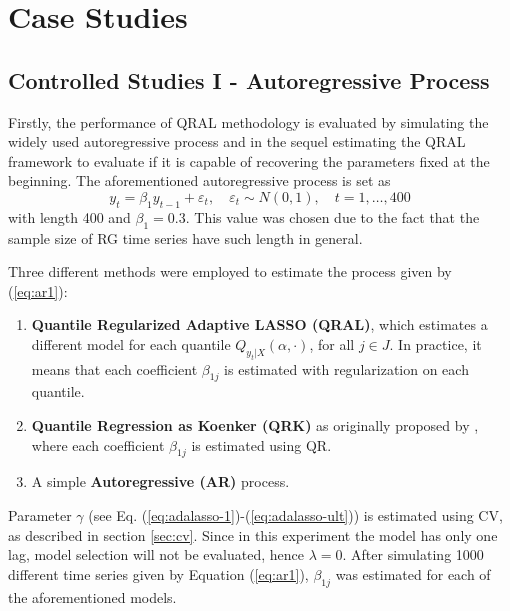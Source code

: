 \section{Case Studies}


\subsection{Controlled Studies I - Autoregressive Process} \label{sec:ar-study}


Firstly, the performance of QRAL methodology is evaluated by simulating the widely used autoregressive process and in the sequel estimating the QRAL framework to evaluate if it is capable of recovering the parameters fixed at the beginning. 
The aforementioned autoregressive process is set as
\begin{equation}
y_t = \beta_1 y_{t-1} + \varepsilon_t, \quad \varepsilon_t \sim N(0, 1), \quad t=1,\dots,400 \label{eq:ar1}
\end{equation}
with length 400 and $\beta_1 = 0.3$. This value was chosen due to the fact that the sample size of RG time series have such length in general.

Three different methods were employed to estimate the process given by (\ref{eq:ar1}):
\begin{enumerate}
\item \textbf{Quantile Regularized Adaptive LASSO (QRAL)}, which estimates a different model for each quantile $Q_{y_t|X}(\alpha,\cdot)$, for all ${j \in J}$. In practice, it means that each coefficient $\beta_{1j}$ is estimated with regularization on each quantile. %
\item \textbf{Quantile Regression as Koenker (QRK)} as originally proposed by \cite{koenker1978regression}, where each coefficient $\beta_{1j}$ is estimated using QR. 
\item A simple \textbf{Autoregressive (AR)} process.%


\end{enumerate}

Parameter $\gamma$ (see Eq. (\ref{eq:adalasso-1})-(\ref{eq:adalasso-ult})) is estimated using CV, as described in section \ref{sec:cv}. Since in this experiment the model has only one lag, model selection will not be evaluated, hence $\lambda=0$.
After simulating 1000 different time series given by Equation (\ref{eq:ar1}), $\beta_{1j}$ was estimated for each of the aforementioned models. 

